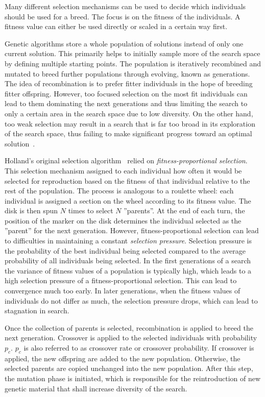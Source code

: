\documentclass[paper=a4,%
  twoside,%
  BCOR4mm,%
  abstract=true,%
  toc=bibliography,%
  chapterprefix=true,%
  toc=bibliographynumbered,%
  open=right,%
  english,%
  pagesize=pdftex]{scrreprt}
\begin{document}
Many different selection mechanisms can be used to decide which individuals should be used for a breed. The focus is on the fitness of the individuals. A fitness value can either be used directly or scaled in a certain way first.

Genetic algorithms store a whole population of solutions instead of only one current solution. This primarily helps to initially sample more of the search space by defining multiple starting points. The population is iteratively recombined and mutated to breed further populations through evolving, known as generations. The idea of recombination is to prefer fitter individuals in the hope of breeding fitter offspring. However, too focused selection on the most fit individuals can lead to them dominating the next generations and thus limiting the search to only a certain area in the search space due to low diversity. On the other hand, too weak selection may result in a search that is far too broad in its exploration of the search space, thus failing to make significant progress toward an optimal solution~\cite{McMinn_2004}.

Holland's original selection algorithm~\cite{Holland1992} relied on \textit{fitness-proportional selection}. This selection mechanism assigned to each individual how often it would be selected for reproduction based on the fitness of that individual relative to the rest of the population. The process is analogous to a roulette wheel: each individual is assigned a section on the wheel according to its fitness value. The disk is then spun $N$ times to select $N$ ''parents''. At the end of each turn, the position of the marker on the disk determines the individual selected as the ''parent'' for the next generation. However, fitness-proportional selection can lead to difficulties in maintaining a constant \textit{selection pressure}. Selection pressure is the probability of the best individual being selected compared to the average probability of all individuals being selected. In the first generations of a search the variance of fitness values of a population is typically high, which leads to a high selection pressure of a fitness-proportional selection. This can lead to convergence much too early. In later generations, when the fitness values of individuals do not differ as much, the selection pressure drops, which can lead to stagnation in search.

Once the collection of parents is selected, recombination is applied to breed the next generation. Crossover is applied to the selected individuals with probability $p_c$. $p_c$ is also referred to as crossover rate or crossover probability. If crossover is applied, the new offspring are added to the new population. Otherwise, the selected parents are copied unchanged into the new population. After this step, the mutation phase is initiated, which is responsible for the reintroduction of new genetic material that shall increase diversity of the search.
\end{document}
